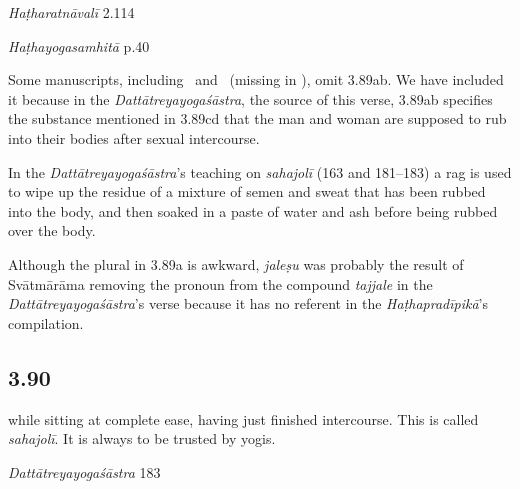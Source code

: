 \begin{ekdosis}
\begin{testimonia}[hp03_089]
\emph{Haṭharatnāvalī} 2.114
\begin{versinnote}
\end{versinnote}

\emph{Haṭhayogasamhitā} p.40
\begin{versinnote}
\end{versinnote}
\end{testimonia}

\begin{philcomm}[hp03_089]
Some manuscripts, including \alphaTwo\ and \alphaThree\ (missing in \alphaOne), omit 3.89ab. We have included it because in the \emph{Dattātreyayogaśāstra}, the source of this verse, 3.89ab specifies the substance mentioned in 3.89cd that the man and woman are supposed to rub into their bodies after sexual intercourse.

In the \emph{Dattātreyayogaśāstra}’s teaching on \emph{sahajolī} (163 and 181–183) a rag is used to wipe up the residue of a mixture of semen and sweat that has been rubbed into the body, and then soaked in a paste of water and ash before being rubbed over the body.

Although the plural in 3.89a is awkward, \emph{jaleṣu} was probably the result of Svātmārāma removing the pronoun from the compound \emph{tajjale} in the \emph{Dattātreyayogaśāstra}'s verse because it has no referent in the \emph{Haṭhapradīpikā}'s compilation.
\end{philcomm}

\subsection*{3.90}
\begin{translation}[hp03_090]
[...] while sitting at complete ease, having just finished intercourse. This is called \emph{sahajolī}. It is always to be trusted by yogis. 
\end{translation}


\begin{sources}[hp03_090]
\emph{Dattātreyayogaśāstra} 183
\begin{versinnote}
\end{versinnote}
\end{sources}


\end{ekdosis}
